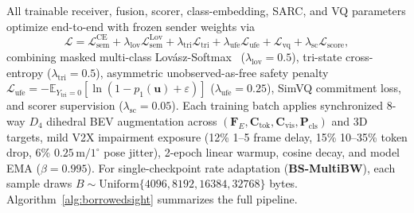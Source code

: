 \documentclass[journal]{IEEEtran}
\begin{document}
All trainable receiver, fusion, scorer, class-embedding, SARC, and VQ parameters optimize end-to-end with frozen sender weights via
\begin{equation}
\mathcal{L} = \mathcal{L}_{\mathrm{sem}}^{\mathrm{CE}} + \lambda_{\mathrm{lov}} \mathcal{L}_{\mathrm{sem}}^{\mathrm{Lov}} + \lambda_{\mathrm{tri}} \mathcal{L}_{\mathrm{tri}} + \lambda_{\mathrm{ufe}} \mathcal{L}_{\mathrm{ufe}} + \mathcal{L}_{\mathrm{vq}} + \lambda_{\mathrm{sc}} \mathcal{L}_{\mathrm{score}},
\label{eq:total_loss}
\end{equation}
combining masked multi-class Lov\'asz-Softmax~\cite{berman2018lovasz} ($\lambda_{\mathrm{lov}} = 0.5$), tri-state cross-entropy ($\lambda_{\mathrm{tri}} = 0.5$), asymmetric unobserved-as-free safety penalty $\mathcal{L}_{\mathrm{ufe}} = -\mathbb{E}_{Y_{\mathrm{tri}}=0}[\ln(1 - p_1(\mathbf{u}) + \varepsilon)]$ ($\lambda_{\mathrm{ufe}} = 0.25$), SimVQ commitment loss, and scorer supervision ($\lambda_{\mathrm{sc}} = 0.05$). Each training batch applies synchronized 8-way $D_4$ dihedral BEV augmentation across $(\mathbf{F}_E, \mathbf{C}_{\mathrm{tok}}, \mathbf{C}_{\mathrm{vis}}, \mathbf{P}_{\mathrm{cls}})$ and 3D targets, mild V2X impairment exposure (12\% 1--5 frame delay, 15\% 10--35\% token drop, 6\% $0.25\,\mathrm{m}/1^\circ$ pose jitter), 2-epoch linear warmup, cosine decay, and model EMA ($\beta = 0.995$). For single-checkpoint rate adaptation (\textbf{BS-MultiBW}), each sample draws $B \sim \mathrm{Uniform}\{4096, 8192, 16384, 32768\}$ bytes. Algorithm~\ref{alg:borrowedsight} summarizes the full pipeline.
\end{document}

